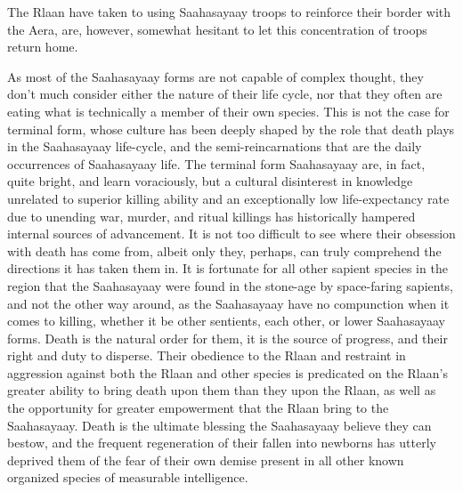 The Rlaan have taken to using Saahasayaay troops to reinforce their
border with the Aera, are, however, somewhat hesitant to let this
concentration of troops return home.

As most of the Saahasayaay forms are not capable of complex thought,
they don't much consider either the nature of their life cycle, nor
that they often are eating what is technically a member of their own
species. This is not the case for terminal form, whose culture has
been deeply shaped by the role that death plays in the Saahasayaay
life-cycle, and the semi-reincarnations that are the daily occurrences
of Saahasayaay life. The terminal form Saahasayaay are, in fact, quite
bright, and learn voraciously, but a cultural disinterest in knowledge
unrelated to superior killing ability and an exceptionally low
life-expectancy rate due to unending war, murder, and ritual killings
has historically hampered internal sources of advancement. It is not
too difficult to see where their obsession with death has come from,
albeit only they, perhaps, can truly comprehend the directions it has
taken them in. It is fortunate for all other sapient species in the
region that the Saahasayaay were found in the stone-age by
space-faring sapients, and not the other way around, as the
Saahasayaay have no compunction when it comes to killing, whether it
be other sentients, each other, or lower Saahasayaay forms. Death is
the natural order for them, it is the source of progress, and their
right and duty to disperse. Their obedience to the Rlaan and restraint
in aggression against both the Rlaan and other species is predicated
on the Rlaan's greater ability to bring death upon them than they upon
the Rlaan, as well as the opportunity for greater empowerment that the
Rlaan bring to the Saahasayaay. Death is the ultimate blessing the
Saahasayaay believe they can bestow, and the frequent regeneration of
their fallen into newborns has utterly deprived them of the fear of
their own demise present in all other known organized species of
measurable intelligence.

